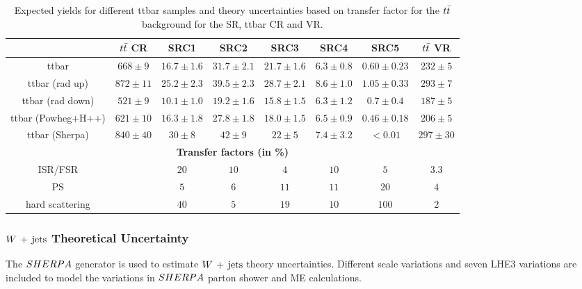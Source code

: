    \begin{table}[!h]
    \begin{center} \footnotesize
      \begin{tabular}{|c|c|c|c|c|c|c|c|}
        \hline
        & $t\bar{t}$ CR & SRC1 & SRC2 & SRC3 & SRC4 & SRC5 & $t\bar{t}$ VR\\
        \hline
ttbar&   $668\pm 9 $&    $16.7\pm 1.6 $&         $31.7\pm 2.1 $&         $21.7\pm 1.6 $&         $6.3\pm 0.8 $&          $0.60\pm 0.23 $&         $232\pm 5 $\\
ttbar (rad up)&          $872\pm 11 $&   $25.2\pm 2.3 $&         $39.5\pm 2.3 $&         $28.7\pm 2.1 $&         $8.6\pm 1.0 $&  $1.05\pm 0.33 $&         $293\pm 7 $\\
ttbar (rad down)&        $521\pm 9 $&    $10.1\pm 1.0 $&         $19.2\pm 1.6 $&         $15.8\pm 1.5 $&         $6.3\pm 1.2 $&  $0.7\pm 0.4 $&   $187\pm 5 $\\
ttbar (Powheg+H++)&      $621\pm 10 $&   $16.3\pm 1.8 $&         $27.8\pm 1.8 $&         $18.0\pm 1.5 $&         $6.5\pm 0.9 $&  $0.46\pm 0.18 $&         $206\pm 5 $\\
ttbar (Sherpa)&          $840\pm 40 $&   $30\pm 8 $&     $42\pm 9 $&     $22\pm 5 $&     $7.4\pm 3.2 $&          $<0.01$&        $297\pm 30 $\\        
        \hline
        \multicolumn{8}{c}{\bf Transfer factors (in \%)} \\ \hline
        ISR/FSR &  &      $20$&   $10$&   $4$&    $10$&   $5$&    $3.3$\\
        PS &     &   $5$&    $6$&    $11$&   $11$&   $20$&   $4$\\
        hard scattering &    &    $40$&   $5$&    $19$&   $10$&   $100$&          $2$\\
        \hline       
        \end{tabular}
    \end{center}
    \caption{Expected yields for different ttbar samples and theory uncertainties based on transfer factor for the $t\bar{t}$ background for the SR, ttbar CR and VR.}
    \label{tab:ttbar_unc_SRC}
  \end{table}

\subsubsection*{$W\,+\,\mathrm{jets}$ Theoretical Uncertainty}

\indent The $SHERPA$ generator is used to estimate $W\,+\,\mathrm{jets}$ theory uncertainties.  Different scale variations and seven LHE3 variations are included to model the variations in $SHERPA$ parton shower and ME calculations.  \\

